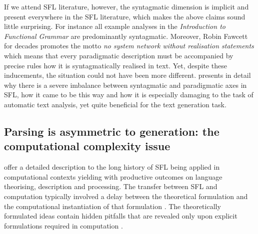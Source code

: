 
If we attend SFL literature, however, the syntagmatic dimension is implicit and present everywhere in the SFL literature, which makes the above claims sound little surprising. For instance all example analyses in the \textit{Introduction to Functional Grammar} \citep{Halliday2013} are predominantly syntagmatic. 
Moreover, Robin Fawcett for decades promotes the motto \textit{no system network without realisation statements} \citep[9]{Fawcett88-good} which means that every paradigmatic description must be accompanied by precise rules how it is syntagmatically realised in text. Yet, despite these inducements, the situation could not have been more different. \citet{Bateman2008} presents in detail why there is a severe imbalance between syntagmatic and paradigmatic axes in SFL, how it came to be this way and how it is especially damaging to the task of automatic text analysis, yet quite beneficial for the text generation task. 

\subsection{Parsing is asymmetric to generation: the computational complexity issue}

\citet{ODonnell2005} offer a detailed description to the long history of SFL being applied in computational contexts yielding with productive outcomes on language theorising, description and processing. The transfer between SFL and computation typically involved a delay between the theoretical formulation and the computational instantiation of that formulation \citep[139]{BatemanMatthiessen88} \citep[19]{MatthiessenBateman91}. The theoretically formulated ideas contain hidden pitfalls that are revealed only upon explicit formulations required in computation \mbox{\citep[27]{Bateman2008}}. 

